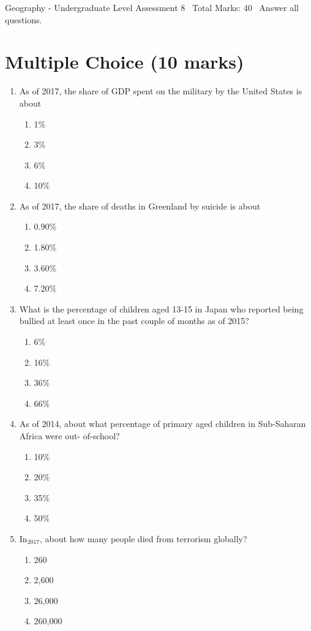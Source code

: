 \documentclass[12pt]{article}
\begin{document}
\begin{center}
Geography - Undergraduate Level Assessment 8 \
Total Marks: 40 \
Answer all questions.
\end{center}

\section*{Multiple Choice (10 marks)}
\begin{enumerate}[label=\arabic*.]
\item As of 2017, the share of GDP spent on the military by the United States is about
\begin{enumerate}[label=(\alph*)]
    \item 1\%
    \item 3\%
    \item 6\%
    \item 10\%
\end{enumerate}
\item As of 2017, the share of deaths in Greenland by suicide is about
\begin{enumerate}[label=(\alph*)]
    \item 0.90\%
    \item 1.80\%
    \item 3.60\%
    \item 7.20\%
\end{enumerate}
\item What is the percentage of children aged 13-15 in Japan who reported being bullied at least once in the past couple of months as of 2015?
\begin{enumerate}[label=(\alph*)]
    \item 6\%
    \item 16\%
    \item 36\%
    \item 66\%
\end{enumerate}
\item As of 2014, about what percentage of primary aged children in Sub-Saharan Africa were out- of-school?
\begin{enumerate}[label=(\alph*)]
    \item 10\%
    \item 20\%
    \item 35\%
    \item 50\%
\end{enumerate}
\item In$_{2017}$, about how many people died from terrorism globally?
\begin{enumerate}[label=(\alph*)]
    \item 260
    \item 2,600
    \item 26,000
    \item 260,000
\end{enumerate}
\end{enumerate}
\end{document}
